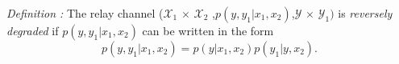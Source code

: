 \documentclass[preview]{standalone}
\begin{document}
\begin{center}
\textit{Definition :} The relay channel ($\mathscr{X}_1$ $\times$ $\mathscr{X}_2$ ,$p(y,y_1|x_1,x_2)$,$\mathscr{Y}$ $\times$ $\mathscr{Y}_1)$ is \textit{reversely degraded} if $p(y, y_1|x_1, x_2)$ can be written in the form \[p(y,y_1|x_1, x_2) = p(y|x_1,x_2)p(y_1|y,x_2).\]
\end{center}
\end{document}
